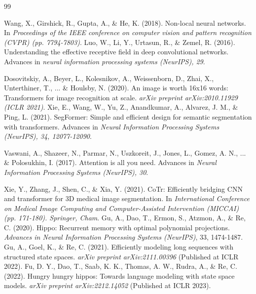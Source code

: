 \documentclass[letterpaper, 10 pt, conference]{ieeeconf}  %
\begin{document}
\begin{thebibliography}{99}



Wang, X., Girshick, R., Gupta, A., \& He, K. (2018). Non-local neural networks. In \textit{Proceedings of the IEEE conference on computer vision and pattern recognition (CVPR) (pp. 7794-7803)}. 
 Luo, W., Li, Y., Urtasun, R., \& Zemel, R. (2016). Understanding the effective receptive field in deep convolutional networks. Advances in \textit{neural information processing systems (NeurIPS), 29}. 

Dosovitskiy, A., Beyer, L., Kolesnikov, A., Weissenborn, D., Zhai, X., Unterthiner, T., ... \& Houlsby, N. (2020). An image is worth 16x16 words: Transformers for image recognition at scale. \textit{arXiv preprint arXiv:2010.11929 (ICLR 2021)}.  
Xie, E., Wang, W., Yu, Z., Anandkumar, A., Alvarez, J. M., \& Ping, L. (2021). SegFormer: Simple and efficient design for semantic segmentation with transformers. Advances in \textit{Neural Information Processing Systems (NeurIPS), 34, 12077-12090}.

Vaswani, A., Shazeer, N., Parmar, N., Uszkoreit, J., Jones, L., Gomez, A. N., ... \& Polosukhin, I. (2017). Attention is all you need. Advances in \textit{Neural Information Processing Systems (NeurIPS), 30}.

Xie, Y., Zhang, J., Shen, C., \& Xia, Y. (2021). CoTr: Efficiently bridging CNN and transformer for 3D medical image segmentation. In \textit{International Conference on Medical Image Computing and Computer-Assisted Intervention (MICCAI) (pp. 171-180). Springer, Cham}. 
Gu, A., Dao, T., Ermon, S., Atzmon, A., \& Re, C. (2020). Hippo: Recurrent memory with optimal polynomial projections. \textit{Advances in Neural Information Processing Systems (NeurIPS)}, 33, 1474-1487.
Gu, A., Goel, K., \& Re, C. (2021). Efficiently modeling long sequences with structured state spaces. \textit{arXiv preprint arXiv:2111.00396} (Published at ICLR 2022).
Fu, D. Y., Dao, T., Saab, K. K., Thomas, A. W., Rudra, A., \& Re, C. (2022). Hungry hungry hippos: Towards language modeling with state space models. \textit{arXiv preprint arXiv:2212.14052} (Published at ICLR 2023).







\end{thebibliography}
\end{document}
